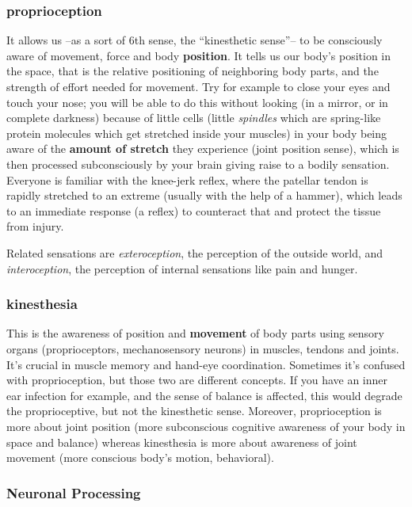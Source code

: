 \subsubsection{\Gls{proprioception}}

It allows us --as a sort of 6th sense, the ``kinesthetic sense''-- to be consciously aware of movement, force and body \textbf{position}.
It tells us our body's position in the space, that is the relative positioning of neighboring body parts, and the strength of effort needed for movement.
Try for example to close your eyes and touch your nose; you will be able to do this without looking (in a mirror, or in complete darkness) because of little cells (little \textit{spindles} which are spring-like protein molecules which get stretched inside your muscles) in your body being aware of the \textbf{amount of stretch} they experience (joint position sense), which is then processed subconsciously by your brain giving raise to a bodily sensation.
Everyone is familiar with the knee-jerk reflex, where the patellar tendon is rapidly stretched to an extreme (usually with the help of a hammer), which leads to an immediate response (a reflex) to counteract that and protect the tissue from injury.

Related sensations are \textit{exteroception}, the perception of the outside world, and \textit{interoception}, the perception of internal sensations like pain and hunger.

\subsubsection{\Gls{kinesthesia}}

This is the awareness of position and \textbf{movement} of body parts using sensory organs (proprioceptors, mechanosensory neurons) in muscles, tendons and joints.
It's crucial in muscle memory and hand-eye coordination.
Sometimes it's confused with proprioception, but those two are different concepts.
If you have an inner ear infection for example, and the sense of balance is affected, this would degrade the proprioceptive, but not the kinesthetic sense.
Moreover, proprioception is more about joint position (more subconscious cognitive awareness of your body in space and balance) whereas kinesthesia is more about awareness of joint movement (more conscious body's motion, behavioral).

\subsubsection{Neuronal Processing}

